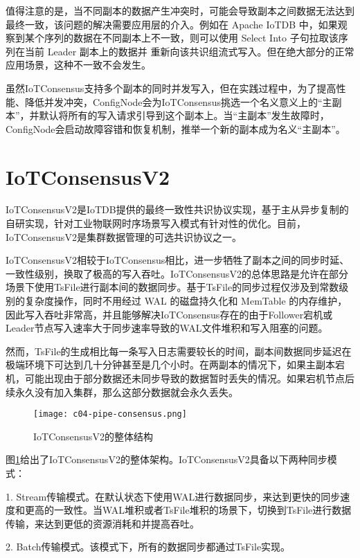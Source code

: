 值得注意的是，当不同副本的数据产生冲突时，可能会导致副本之间数据无法达到最终一致，该问题的解决需要应用层的介入。例如在 Apache IoTDB 中，如果观察到某个序列的数据在不同副本上不一致，则可以使用 Select Into 子句拉取该序列在当前 Leader 副本上的数据并
重新向该共识组流式写入。但在绝大部分的正常应用场景，这种不一致不会发生。

虽然IoTConsensus支持多个副本的同时并发写入，但在实践过程中，为了提高性能、降低并发冲突，ConfigNode会为IoTConsensus挑选一个名义意义上的“主副本”，并默认将所有的写入请求引导到这个副本上。当“主副本”发生故障时，ConfigNode会启动故障容错和恢复机制，推举一个新的副本成为名义“主副本”。


\section{IoTConsensusV2}

IoTConsensusV2是IoTDB提供的最终一致性共识协议实现，基于主从异步复制的自研实现，针对工业物联网时序场景写入模式有针对性的优化。目前，IoTConsensusV2是集群数据管理的可选共识协议之一。

IoTConsensusV2相较于IoTConsensus相比，进一步牺牲了副本之间的同步时延、一致性级别，换取了极高的写入吞吐。IoTConsensusV2的总体思路是允许在部分场景下使用TsFile进行副本间的数据同步。基于TsFile的同步过程仅涉及到常数级别的复杂度操作，同时不用经过 WAL 的磁盘持久化和 MemTable 的内存维护，因此写入吞吐非常高，并且能够解决IoTConsensus存在的由于Follower宕机或Leader节点写入速率大于同步速率导致的WAL文件堆积和写入阻塞的问题。

然而，TsFile的生成相比每一条写入日志需要较长的时间，副本间数据同步延迟在极端环境下可达到几十分钟甚至是几个小时。在两副本的情况下，如果主副本宕机，可能出现由于部分数据还未同步导致的数据暂时丢失的情况。如果宕机节点后续永久没有加入集群，那么这部分数据就会永久丢失。

\begin{figure}
    \centering
    \texttt{[image: c04-pipe-consensus.png]}
    \caption{IoTConsensusV2的整体结构}
    \label{fig:c04-pipe-consensus}
  \end{figure}
  
图\ref{fig:c04-pipe-consensus}给出了IoTConsensusV2的整体架构。IoTConsensusV2具备以下两种同步模式：

1. Stream传输模式。在默认状态下使用WAL进行数据同步，来达到更快的同步速度和更高的一致性。当WAL堆积或者TsFile堆积的场景下，切换到TsFile进行数据传输，来达到更低的资源消耗和并提高吞吐。

2. Batch传输模式。该模式下，所有的数据同步都通过TsFile实现。

